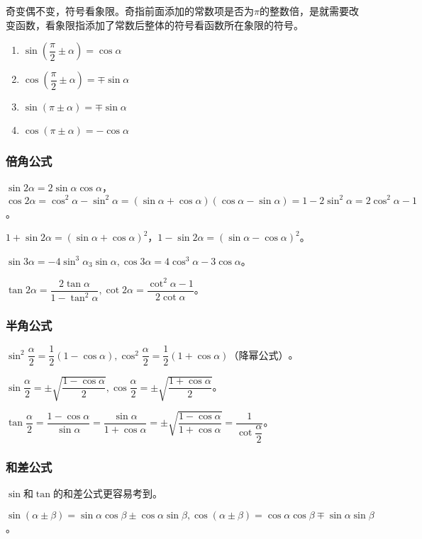 \documentclass[UTF8, 12pt]{ctexart}
\begin{document}
奇变偶不变，符号看象限。奇指前面添加的常数项是否为$\pi$的整数倍，是就需要改变函数，看象限指添加了常数后整体的符号看函数所在象限的符号。

\begin{enumerate}
    \item $\sin(\dfrac{\pi}{2}\pm\alpha)=\cos\alpha$
    \item $\cos(\dfrac{\pi}{2}\pm\alpha)=\mp\sin\alpha$
    \item $\sin(\pi\pm\alpha)=\mp\sin\alpha$
    \item $\cos(\pi\pm\alpha)=-\cos\alpha$
\end{enumerate}

\subsubsection{倍角公式}

$\sin 2\alpha=2\sin\alpha\cos\alpha$，$\cos 2\alpha=\cos^2\alpha-\sin^2\alpha=(\sin\alpha+\cos\alpha)(\cos\alpha-\sin\alpha)=1-2\sin^2\alpha=2\cos^2\alpha-1$。

$1+\sin2\alpha=(\sin\alpha+\cos\alpha)^2$，$1-\sin2\alpha=(\sin\alpha-\cos\alpha)^2$。

$\sin 3\alpha=-4\sin^3\alpha_3\sin\alpha,\cos 3\alpha=4\cos^3\alpha-3\cos\alpha$。

$\tan 2\alpha=\dfrac{2\tan\alpha}{1-\tan^2\alpha},\cot 2\alpha=\dfrac{\cot^2\alpha-1}{2\cot\alpha}$。

\subsubsection{半角公式}

$\sin^2\dfrac{\alpha}{2}=\dfrac{1}{2}(1-\cos\alpha),\cos^2\dfrac{\alpha}{2}=\dfrac{1}{2}(1+\cos\alpha)\text{（降幂公式）}$。

$\sin\dfrac{\alpha}{2}=\pm\sqrt{\dfrac{1-\cos\alpha}{2}},\cos\dfrac{\alpha}{2}=\pm\sqrt{\dfrac{1+\cos\alpha}{2}}$。

$\tan\dfrac{\alpha}{2}=\dfrac{1-\cos\alpha}{\sin\alpha}=\dfrac{\sin\alpha}{1+\cos\alpha}=\pm\sqrt{\dfrac{1-\cos\alpha}{1+\cos\alpha}}=\dfrac{1}{\cot\dfrac{\alpha}{2}}$。

\subsubsection{和差公式}

$\sin$和$\tan$的和差公式更容易考到。

$\sin(\alpha\pm\beta)=\sin\alpha\cos\beta\pm\cos\alpha\sin\beta,\cos(\alpha\pm\beta)=\cos\alpha\cos\beta\mp\sin\alpha\sin\beta$。
\end{document}
